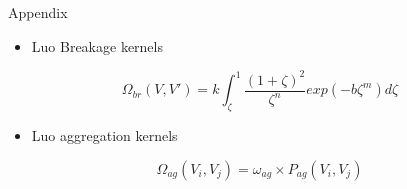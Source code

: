 \documentclass{beamer}
\begin{document}
\begin{frame}{Appendix}

\begin{itemize}
\item Luo Breakage kernels
\end{itemize}

\begin{equation*}
\Omega_{br}(V,V')= k \int_{\zeta}^{1}\frac{{(1+\zeta)}^2}{\zeta^n} exp(-b\zeta^m)d\zeta
\end{equation*}

\begin{itemize}
\item Luo aggregation kernels
\end{itemize}

\begin{equation*}
\Omega_{ag}(V_i,V_j)= \omega_{ag} \times P_{ag} (V_i,V_j)
\end{equation*}

\end{frame}





\end{document}
